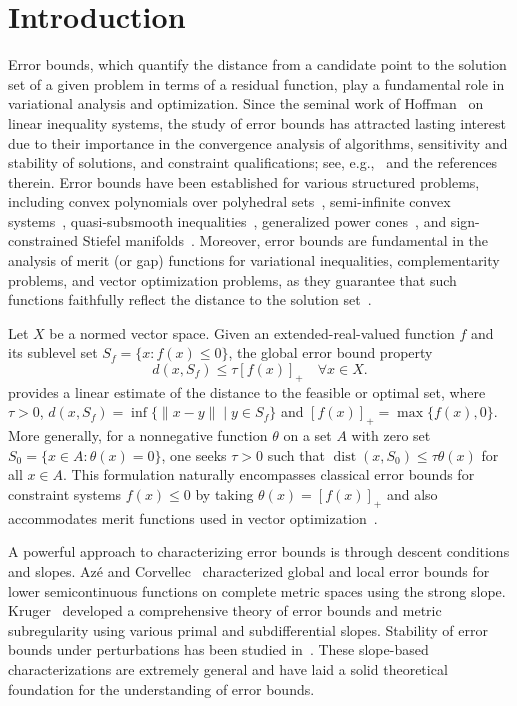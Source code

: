 \documentclass[11pt]{article}
\begin{document}
\section{Introduction}
Error bounds, which quantify the distance from a candidate point to the solution set of a given problem in terms of a residual function, play a fundamental role in variational analysis and optimization. Since the seminal work of Hoffman~\cite{Hoffman} on linear inequality systems, the study of error bounds has attracted lasting interest due to their importance in the convergence analysis of algorithms, sensitivity and stability of solutions, and constraint qualifications; see, e.g.,~\cite{Pang1997, FacchineiPang,  AC2004,KL1999,Kruger,KLT2018,NgZheng,Penot2019,Hu2007,Zheng2012,VanNgai2010,Ngai2015, Wu2002, Li2009} and the references therein. Error bounds have been established for various structured problems, including convex polynomials over polyhedral sets~\cite{Ngai2015}, semi-infinite convex systems~\cite{VanNgai2010}, quasi-subsmooth inequalities~\cite{Zheng2012}, generalized power cones~\cite{Lin2024}, and sign-constrained Stiefel manifolds~\cite{Chen2025}. Moreover, error bounds are fundamental in the analysis of merit (or gap) functions for variational inequalities, complementarity problems, and vector optimization problems, as they guarantee that such functions faithfully reflect the distance to the solution set~\cite{YaoZheng2018, HMTZ2020, Hearn,Fukushima,FacchineiPang, Li2009, DKG2017, LM2010,TanabeNew}.

Let \( X \) be a   normed vector space.   Given an extended-real-valued function \(f\) and its sublevel set \(S_f = \{x : f(x) \le 0\}\), the global error bound property
\begin{equation}\label{EWJ1}
	d (x, S_f) \le \tau [f(x)]_+   \quad \forall x \in  X.
\end{equation}
provides a linear estimate of the distance to the feasible or optimal set,  where  $\tau > 0$, 
$	d (x, S_f ) = \inf \{ \|x - y\| \mid y \in S_f  \}	$	and $	[f(x)]_+ = \max \{ f(x), 0 \}.$
More generally, for a nonnegative function \(\theta\) on a set \(A\) with zero set \(S_0 = \{x \in A : \theta(x) = 0\}\), one seeks \(\tau >0\) such that \(\operatorname{dist}(x,S_0) \le \tau \theta(x)\) for all \(x \in A\). This formulation naturally encompasses classical error bounds for constraint systems \(f(x)\le 0\) by taking \(\theta(x) = [f(x)]_+\) and also accommodates merit functions used in vector optimization~\cite{LiuNgYang2009}.

A powerful approach to characterizing error bounds is through descent conditions and slopes.  
Az\'{e} and Corvellec~\cite{AC2004} characterized global and local error bounds for lower semicontinuous functions on complete metric spaces using the strong slope.   Kruger~\cite{Kruger} developed a comprehensive theory of error bounds and metric subregularity using various primal and subdifferential slopes. Stability of error bounds under perturbations has been studied in~\cite{KLT2018,KNT2010}. These slope-based characterizations are extremely general and have laid a solid theoretical foundation for the understanding of error bounds.
\end{document}
